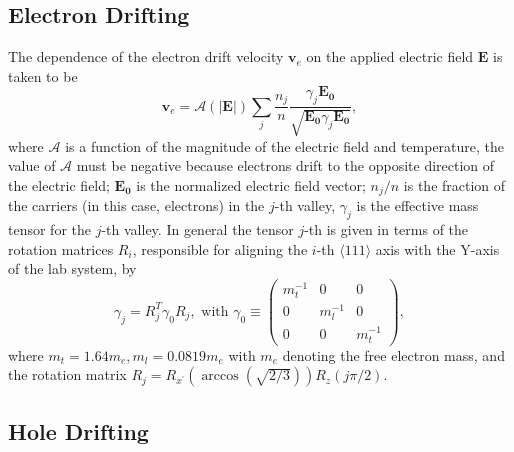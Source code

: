 \subsection{Electron Drifting}
\label{sec:elec}
The dependence of the electron drift velocity $\mathbf{v}_{e}$ on the applied electric field $\mathbf{E}$ is taken to be
\begin{equation}
  \label{eq:ed}
  \mathbf{v}_{e} = \mathcal{A}(|\mathbf{E}|) \sum_{j} \frac{n_{j}}{n}   \frac{\gamma_{j}\mathbf{E_{0}}}   {\sqrt{\mathbf{E_{0}}\gamma_{j}\mathbf{E_{0}}}},
\end{equation}
where $\mathcal{A}$ is a function of the magnitude of the electric field and temperature, the value of $\mathcal{A}$ must be negative because electrons drift to the opposite direction of the electric field; $\mathbf{E_{0}}$ is the normalized electric field vector; $n_{j}/n$ is the fraction  of the carriers (in this case, electrons) in the $j$-th valley, $\gamma_{j}$ is the effective mass tensor for the $j$-th valley. In general the tensor $j$-th is given in terms of the rotation matrices $R_{i}$, responsible for aligning the $i$-th $\langle 111 \rangle$ axis with the Y-axis of the lab system, by
\begin{equation}
  \label{eq:gammas}
  \gamma_{j} = R_{j}^{T}\gamma_{0}R_{j}, \mbox{ with } \gamma_{0}   \equiv \left(
    \begin{array}{ccc}
      m_{t}^{-1} & 0 & 0 \\
      0 & m_{l}^{-1} & 0 \\
      0 & 0 & m_{t}^{-1}
    \end{array} \right),
\end{equation}
where $m_{t} = 1.64m_{e}, m_{l} = 0.0819m_{e}$ with $m_{e}$ denoting the free electron mass, and the rotation matrix $R_{j} = R_{x^{\prime}}(\arccos(\sqrt{2/3}))R_{z}(j\pi/2)$.

\subsection{Hole Drifting}
\label{sec:hole}

